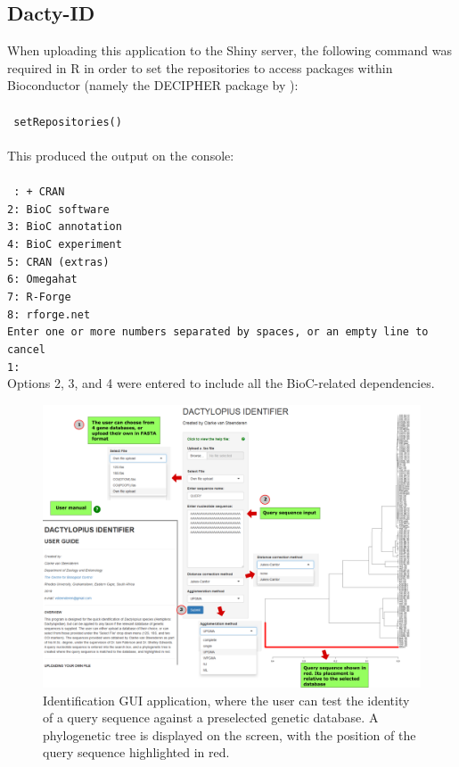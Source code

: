 \subsection{Dacty-ID}

When uploading this application to the Shiny server, the following command was required in R in order to set the repositories to access packages within Bioconductor (namely the DECIPHER package by \citet{wright2016using}): \\ \\
\noindent
\texttt{
setRepositories() \\
} \\
\noindent This produced the output on the console: \\ \\
\texttt{
: + CRAN \\
2:   BioC software \\
3:   BioC annotation \\
4:   BioC experiment \\
5:   CRAN (extras) \\
6:   Omegahat \\
7:   R-Forge \\
8:   rforge.net \\
Enter one or more numbers separated by spaces, or an empty line to cancel \\
1: } \\

\noindent Options 2, 3, and 4 were entered to include all the BioC-related dependencies.

\begin{landscape}
\begin{figure}[H]
	\centering
	\includegraphics[scale = 0.4]{Images/dactylopius_identifier_GUI.pdf}
	\caption{Identification GUI application, where the user can test the identity of a query sequence against a preselected genetic database. A phylogenetic tree is displayed on the screen, with the position of the query sequence highlighted in red.}
	\label{fig:identifier_GUI}
\end{figure}
\end{landscape}

